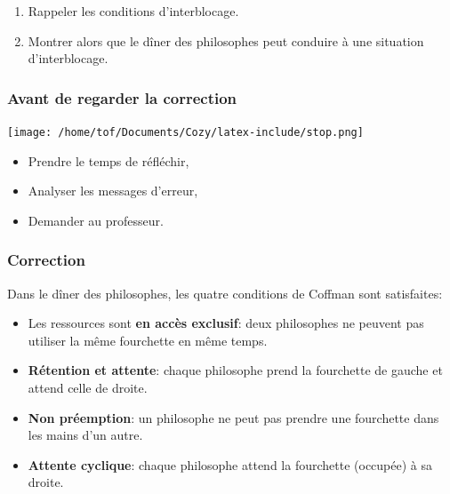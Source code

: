 \documentclass[svgnames,11pt]{beamer}
\begin{document}
\begin{frame}
    \frametitle{}

    \begin{activite}
    \begin{enumerate}
        \item Rappeler les conditions d'interblocage.
        \item Montrer alors que le dîner des philosophes peut conduire à une situation d'interblocage.
    \end{enumerate}
    \end{activite}

\end{frame}
\begin{frame}
    \frametitle{Avant de regarder la correction}
\begin{center}
    \centering
    \texttt{[image: /home/tof/Documents/Cozy/latex-include/stop.png]}
    \end{center}
{\Large
    \begin{itemize}
        \item Prendre le temps de réfléchir,
        \item Analyser les messages d'erreur,
        \item Demander au professeur.
    \end{itemize}
}
\end{frame}
\begin{frame}
    \frametitle{Correction}

Dans le dîner des philosophes, les quatre conditions de Coffman sont satisfaites:
\begin{itemize}
\item Les ressources sont \textbf{en accès exclusif}: deux philosophes ne peuvent pas utiliser la même fourchette en même temps.
\item \textbf{Rétention et attente}: chaque philosophe prend la fourchette de gauche et attend celle de droite.
\item \textbf{Non préemption}: un philosophe ne peut pas prendre une fourchette dans les mains d'un autre.
\item \textbf{Attente cyclique}: chaque philosophe attend la fourchette (occupée) à sa droite.
\end{itemize}

\end{frame}
\end{document}

